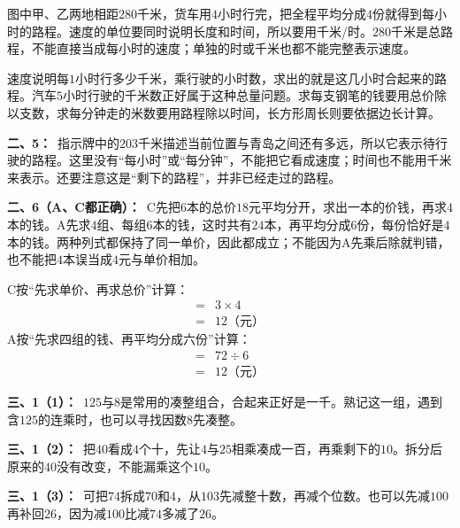 \documentclass[multi=snippet,border=0pt]{standalone}
\newenvironment{snippet}[3]{\begin{minipage}{#1bp}\color{answerred}\fontsize{#2}{#3}\selectfont\raggedright}{\end{minipage}}
\begin{document}
\begin{snippet}{505}{11.5}{14}图中甲、乙两地相距\(280\)千米，货车用\(4\)小时行完，把全程平均分成\(4\)份就得到每小时的路程。速度的单位要同时说明长度和时间，所以要用千米/时。\(280\)千米是总路程，不能直接当成每小时的速度；单独的时或千米也都不能完整表示速度。\end{snippet}
\begin{snippet}{505}{11.5}{14}速度说明每\(1\)小时行多少千米，乘行驶的小时数，求出的就是这几小时合起来的路程。汽车\(5\)小时行驶的千米数正好属于这种总量问题。求每支钢笔的钱要用总价除以支数，求每分钟走的米数要用路程除以时间，长方形周长则要依据边长计算。\end{snippet}
\begin{snippet}{505}{11.5}{14}\textbf{二、5：}\ 指示牌中的\(203\)千米描述当前位置与青岛之间还有多远，所以它表示待行驶的路程。这里没有“每小时”或“每分钟”，不能把它看成速度；时间也不能用千米来表示。还要注意这是“剩下的路程”，并非已经走过的路程。\end{snippet}
\begin{snippet}{505}{11.5}{14}\textbf{二、6（A、C都正确）：}\ C先把\(6\)本的总价\(18\)元平均分开，求出一本的价钱，再求\(4\)本的钱。A先求\(4\)组、每组\(6\)本的钱，这时共有\(24\)本，再平均分成\(6\)份，每份恰好是\(4\)本的钱。两种列式都保持了同一单价，因此都成立；不能因为A先乘后除就判错，也不能把\(4\)本误当成\(4\)元与单价相加。\par C按“先求单价、再求总价”计算：\[\begin{aligned}={}&3\times4\\={}&12\text{（元）}\end{aligned}\]A按“先求四组的钱、再平均分成六份”计算：\[\begin{aligned}={}&72\div6\\={}&12\text{（元）}\end{aligned}\]\end{snippet}
\begin{snippet}{505}{11.5}{14}\textbf{三、1（1）：}\ \(125\)与\(8\)是常用的凑整组合，合起来正好是一千。熟记这一组，遇到含\(125\)的连乘时，也可以寻找因数\(8\)先凑整。\end{snippet}
\begin{snippet}{505}{11.5}{14}\textbf{三、1（2）：}\ 把\(40\)看成\(4\)个十，先让\(4\)与\(25\)相乘凑成一百，再乘剩下的\(10\)。拆分后原来的\(40\)没有改变，不能漏乘这个\(10\)。\end{snippet}
\begin{snippet}{505}{11.5}{14}\textbf{三、1（3）：}\ 可把\(74\)拆成\(70\)和\(4\)，从\(103\)先减整十数，再减个位数。也可以先减\(100\)再补回\(26\)，因为减\(100\)比减\(74\)多减了\(26\)。\end{snippet}
\end{document}
